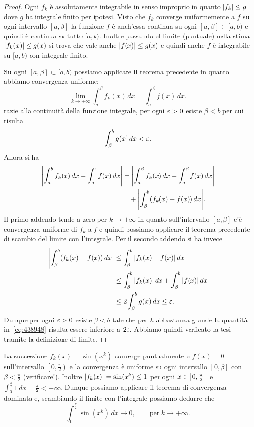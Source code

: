 \begin{proof}
Ogni $f_k$ è assolutamente integrabile in senso improprio in quanto
${\left|f_k\right|}\le g$ dove $g$ ha integrale finito per ipotesi.
Visto che $f_k$ converge uniformemente a $f$ su ogni intervallo $[a,\beta]$
la funzione $f$ è anch'essa continua su ogni $[a,\beta]\subset[a,b)$
e quindi è continua su tutto $[a,b)$. Inoltre passando al limite (puntuale)
nella stima ${\left|f_k(x)\right|}\le g(x)$ si trova che vale anche ${\left|f(x)\right|}\le g(x)$
e quindi anche $f$ è integrabile su $[a,b)$ con integrale finito.

Su ogni $[a,\beta]\subset [a,b)$ possiamo applicare il teorema precedente
in quanto abbiamo convergenza uniforme:
\[
  \lim_{k\to+\infty} \int_a^\beta f_k(x)\, dx = \int_a^\beta f(x)\, dx.
\]
razie alla continuità della funzione integrale,
per ogni $\varepsilon>0$ esiste $\beta<b$ per cui risulta
\[
  \int_{\beta}^b g(x)\, dx < \varepsilon.
\]
Allora si ha
\begin{equation}\label{eq:438948}
\begin{aligned}
  {\left|\int_a^b f_k(x)\, dx - \int_a^b f(x)\, dx\right|}
  &= {\left|\int_a^\beta f_k(x)\, dx - \int_a^\beta f(x)\, dx\right|}\\
  &\quad + {\left|\int_\beta^b (f_k(x) - f(x))\, dx \right|}.
   \end{aligned}
\end{equation}
Il primo addendo tende a zero per $k\to +\infty$ in quanto
sull'intervallo $[a,\beta]$ c'è convergenza uniforme di $f_k$
a $f$ e quindi possiamo applicare il teorema precedente
di scambio del limite con l'integrale. Per il secondo addendo
si ha invece
\begin{align*}
{\left|\int_\beta^b (f_k(x) - f(x))\, dx \right|}
&\le \int_\beta^b {\left|f_k(x)-f(x)\right|}\, dx\\
&\le \int_\beta^b {\left|f_k(x)\right|}\, dx + \int_\beta^b {\left|f(x)\right|}\, dx\\
&\le 2 \int_\beta^b g(x)\, dx \le \varepsilon.
\end{align*}
Dunque per ogni $\varepsilon>0$ esiste $\beta<b$ tale che per $k$ abbastanza
grande
la quantità in~\eqref{eq:438948} risulta essere inferiore a $2\varepsilon$.
Abbiamo quindi verficato la tesi tramite la definizione di limite.
\end{proof}

\begin{example}
La successione $f_k(x) = \sin(x^k)$ converge puntualmente a $f(x)=0$ sull'intervallo
$\left[0,\frac \pi2\right)$ e la convergenza è uniforme su ogni intervallo $[0,\beta]$
con $\beta < \frac \pi 2$ (verificare!).
Inoltre ${\left|f_k(x)\right|} = \sin(x^k) \le 1$ per ogni $x\in {\left[ 0,\frac \pi 2 \right]}$
e $\int_0^{\frac \pi 2} 1\, dx = \frac \pi 2 < +\infty$.
Dunque possiamo applicare il teorema di convergenza dominata e,
scambiando il limite con l'integrale possiamo dedurre che
\[
  \int_0^{\frac \pi 2} \sin (x^k)\, dx \to 0, \qquad \text{per $k\to +\infty$.}
\]

\end{example}

